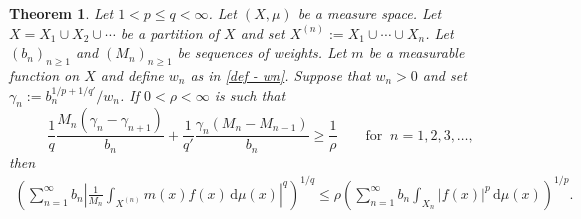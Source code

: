 \documentclass[oneside,10pt]{article}          %
\newtheorem{thm}{Theorem}
\numberwithin{equation}{section}
\begin{document}
\begin{thm}\label{thm - main}
    Let $1< p\leq q<\infty$. Let $(X,\mu)$ be a measure space. Let $X = X_1 \cup X_2 \cup \cdots$ be a partition of $X$ and set $X^{(n)} := X_1 \cup \cdots \cup X_n$. Let $(b_n)_{n\geq 1}$ and $(M_n)_{n\geq 1}$ be sequences of weights. Let $m$ be a measurable function on $X$ and define $w_n$ as in \eqref{def - wn}. Suppose that $w_n>0$ and set $\gamma_n:=b_n^{1/p+1/q'}\!\!/w_n$. If $0<\rho<\infty$ is such that
    \[
    \frac{1}{q}\frac{M_n(\gamma_n-\gamma_{n+1})}{b_n}
    +\frac{1}{q'}\frac{\gamma_n(M_n-M_{n-1})}{b_n}
    \geq
    \frac{1}{\rho}
    \qquad \text{for }~ n=1,2,3,\dots,
    \]
    then
    \begin{align*}
        \left(
        \sum_{n = 1}^\infty b_n
        \left| \frac{1}{M_n} \int_{X^{(n)}} m (x) f (x)
        \,\mathrm{d}\mu (x) \right|^q
        \right)^{\!\!1/q}
        \leq
        \rho
        \left(
        \sum_{n = 1}^\infty b_n \int_{X_n} |f (x)|^p
        \,\mathrm{d}\mu (x)
        \right)^{\!\!1/p}.
    \end{align*}
\end{thm}
\end{document}

